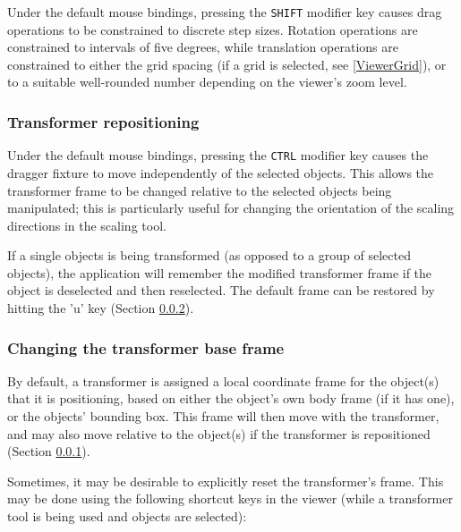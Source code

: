 \documentclass{article}
\begin{document}
Under the default mouse bindings, pressing the {\tt SHIFT} modifier
key causes drag operations to be constrained to discrete step sizes.
Rotation operations are constrained to
intervals of five degrees, while translation operations are
constrained to either the grid spacing (if a grid is selected, see
\ref{ViewerGrid}), or to a suitable well-rounded number depending on
the viewer's zoom level.

\subsubsection{Transformer repositioning}
\label{ChangingTransformerPose}

Under the default mouse bindings, pressing the {\tt CTRL} modifier key
causes the dragger fixture to move independently of the selected
objects. This allows the transformer frame to be changed relative to
the selected objects being manipulated; this is particularly useful
for changing the orientation of the scaling directions in the scaling
tool.

If a single objects is being transformed (as opposed to a group of
selected objects), the application will remember the modified
transformer frame if the object is deselected and then reselected. The
default frame can be restored by hitting the 'u' key (Section
\ref{ChangingTransformerBaseFrame:sec}).

\subsubsection{Changing the transformer base frame}
\label{ChangingTransformerBaseFrame:sec}

By default, a transformer is assigned a local coordinate frame for the
object(s) that it is positioning, based on either the object's own
body frame (if it has one), or the objects' bounding box. This frame
will then move with the transformer, and may also move relative to the
object(s) if the transformer is repositioned (Section
\ref{ChangingTransformerPose}).

Sometimes, it may be desirable to explicitly reset the transformer's
frame. This may be done using the following shortcut keys in the
viewer (while a transformer tool is being used and objects are
selected):
\end{document}
